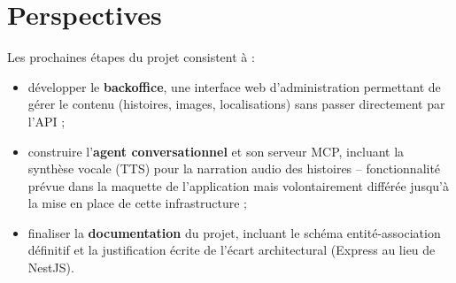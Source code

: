 \documentclass[11pt,a4paper]{article}
\begin{document}
\section{Perspectives}

Les prochaines étapes du projet consistent à :

\begin{itemize}[nosep]
    \item développer le \textbf{backoffice}, une interface web d'administration permettant de gérer le contenu (histoires, images, localisations) sans passer directement par l'API ;
    \item construire l'\textbf{agent conversationnel} et son serveur MCP, incluant la synthèse vocale (TTS) pour la narration audio des histoires -- fonctionnalité prévue dans la maquette de l'application mais volontairement différée jusqu'à la mise en place de cette infrastructure ;
    \item finaliser la \textbf{documentation} du projet, incluant le schéma entité-association définitif et la justification écrite de l'écart architectural (Express au lieu de NestJS).
\end{itemize}
\end{document}
